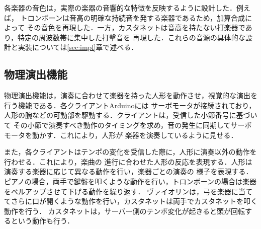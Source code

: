 各楽器の音色は，実際の楽器の音響的な特徴を反映するように設計した．例えば，
トロンボーンは音高の明確な持続音を発する楽器であるため，加算合成によって
その音色を再現した．一方，カスタネットは音高を持たない打楽器であり，特定の周波数帯に集中した打撃音を
再現した．これらの音源の具体的な設計と実装については\ref{sec:impl}章で述べる．

\subsection{物理演出機能}
物理演出機能は，演奏に合わせて楽器を持った人形を動作させ，視覚的な演出を行う機能である．各クライアントArduinoには
サーボモータが接続されており，人形の腕などの可動部を駆動する．クライアントは，受信した小節番号に基づいて
その小節で演奏すべき動作のタイミングを求め，音の発生に同期してサーボモータを動かす．これにより，人形が
楽器を演奏しているように見せる．

また，各クライアントはテンポの変化を受信した際に，人形に演奏以外の動作を行わせる．これにより，楽曲の
進行に合わせた人形の反応を表現する．人形は演奏する楽器に応じて異なる動作を行い，楽器ごとの演奏の
様子を表現する．ピアノの場合，両手で鍵盤を叩くような動作を行い，トロンボーンの場合は楽器をベルアップさせて下げる動作を繰り返す．
ヴァイオリンは，弓を楽器に当ててさらに口が開くような動作を行い，カスタネットは両手でカスタネットを叩く動作を行う．
カスタネットは，サーバー側のテンポ変化が起きると頭が回転するという動作も行う．